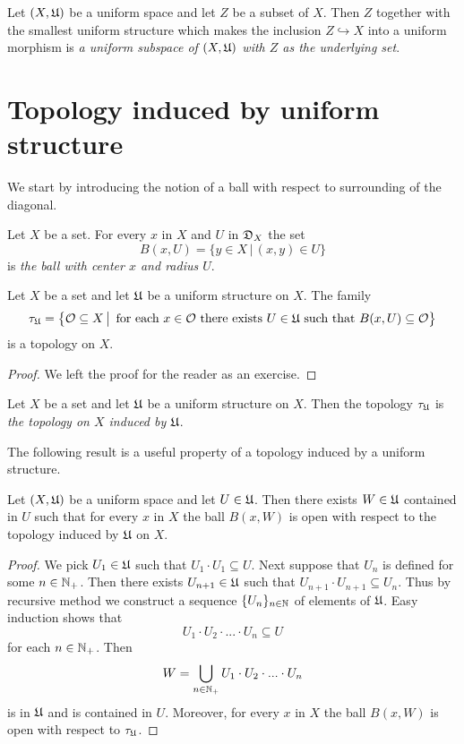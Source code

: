 \begin{definition}
Let $(X,{\mathfrak U})$ be a uniform space and let $Z$ be a subset of $X$. Then $Z$ together with the smallest uniform structure which makes the inclusion $Z\hookrightarrow X$ into a uniform morphism is \textit{a uniform subspace of $(X,{\mathfrak U})$ with $Z$ as the underlying set}.
\end{definition}

\section{Topology induced by uniform structure}
\noindent
We start by introducing the notion of a ball with respect to surrounding of the diagonal.

\begin{definition}
Let $X$ be a set. For every $x$ in $X$ and $U$ in ${\mathfrak D}_X$ the set
$$B(x,U) = \big\{y\in X\,\big|\,(x,y)\in U\big\}$$
is \textit{the ball with center $x$ and radius $U$}.
\end{definition}

\begin{fact}\label{fact:topology_induced_by_uniform_structure}
Let $X$ be a set and let ${\mathfrak U}$ be a uniform structure on $X$. The family
$$\tau_{{\mathfrak U}} = \big\{{\mathcal O}\subseteq X\,\big|\,\mbox{ for each }x\in {\mathcal O}\mbox{ there exists }U\in {\mathfrak U}\mbox{ such that }B(x,U)\subseteq {\mathcal O}\big\}$$
is a topology on $X$.
\end{fact}
\begin{proof}
We left the proof for the reader as an exercise.
\end{proof}

\begin{definition}
Let $X$ be a set and let ${\mathfrak U}$ be a uniform structure on $X$. Then the topology $\tau_{{\mathfrak U}}$ is \textit{the topology on $X$ induced by ${\mathfrak U}$}.
\end{definition}
\noindent
The following result is a useful property of a topology induced by a uniform structure. 

\begin{proposition}\label{proposition:each_ball_contains_open_ball}
Let $(X,{\mathfrak U})$ be a uniform space and let $U \in {\mathfrak U}$. Then there exists $W \in {\mathfrak U}$ contained in $U$ such that for every $x$ in $X$ the ball $B(x,W)$ is open with respect to the topology induced by ${\mathfrak U}$ on $X$.
\end{proposition}
\begin{proof}
We pick $U_1 \in {\mathfrak U}$ such that $U_1\cdot U_1 \subseteq U$. Next suppose that $U_n$ is defined for some $n\in {\mathbb N}_+$. Then there exists $U_{n+1}\in {\mathfrak U}$ such that $U_{n+1}\cdot U_{n+1} \subseteq U_n$. Thus by recursive method we construct a sequence $\{U_n\}_{n\in {\mathbb N}}$ of elements of ${\mathfrak U}$. Easy induction shows that
$$U_1\cdot U_2\cdot ...\cdot U_n \subseteq U$$
for each $n\in {\mathbb N}_+$. Then
$$W = \bigcup_{n\in {\mathbb N}_+}U_{1}\cdot U_{2}\cdot ...\cdot U_{n}$$
is in ${\mathfrak U}$ and is contained in $U$. Moreover, for every $x$ in $X$ the ball $B(x,W)$ is open with respect to $\tau_{{\mathfrak U}}$.
\end{proof}

